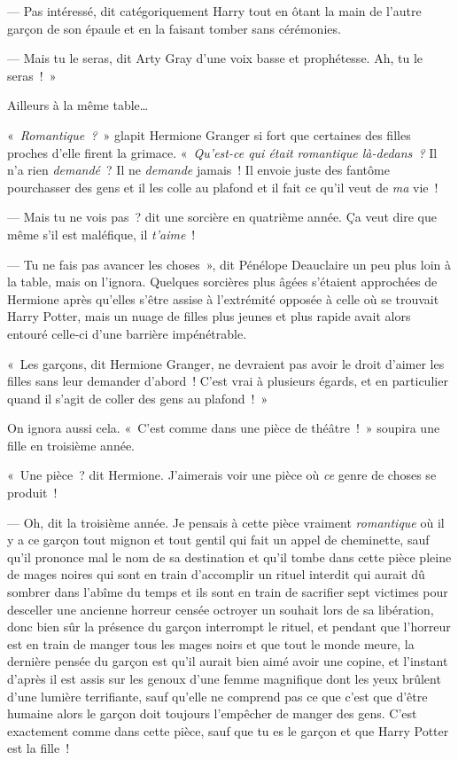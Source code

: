 --- Pas intéressé, dit catégoriquement Harry tout en ôtant la main de l'autre garçon de son épaule et en la faisant tomber sans cérémonies.

--- Mais tu le seras, dit Arty Gray d'une voix basse et prophétesse.
Ah, tu le seras~!~»

Ailleurs à la même table…

«~\emph{Romantique~?}~» glapit Hermione Granger si fort que certaines des filles proches d'elle firent la grimace.
«~\emph{Qu'est-ce qui était romantique là-dedans~?} Il n'a rien \emph{demandé}~?
Il ne \emph{demande} jamais~!
Il envoie juste des fantôme pourchasser des gens et il les colle au plafond et il fait ce qu'il veut de \emph{ma} vie~!

--- Mais tu ne vois pas~? dit une sorcière en quatrième année.
Ça veut dire que même s'il est maléfique, il \emph{t'aime}~!

--- Tu ne fais pas avancer les choses~», dit Pénélope Deauclaire un peu plus loin à la table, mais on l'ignora.
Quelques sorcières plus âgées s'étaient approchées de Hermione après qu'elles s'être assise à l'extrémité opposée à celle où se trouvait Harry Potter, mais un nuage de filles plus jeunes et plus rapide avait alors entouré celle-ci d'une barrière impénétrable.

«~Les garçons, dit Hermione Granger, ne devraient pas avoir le droit d'aimer les filles sans leur demander d'abord~!
C'est vrai à plusieurs égards, et en particulier quand il s'agit de coller des gens au plafond~!~»

On ignora aussi cela.
«~C'est comme dans une pièce de théâtre~!~»
soupira une fille en troisième année.

«~Une pièce~? dit Hermione.
J'aimerais voir une pièce où \emph{ce} genre de choses se produit~!

--- Oh, dit la troisième année.
Je pensais à cette pièce vraiment \emph{romantique} où il y a ce garçon tout mignon et tout gentil qui fait un appel de cheminette, sauf qu'il prononce mal le nom de sa destination et qu'il tombe dans cette pièce pleine de mages noires qui sont en train d'accomplir un rituel interdit qui aurait dû sombrer dans l'abîme du temps et ils sont en train de sacrifier sept victimes pour desceller une ancienne horreur censée octroyer un souhait lors de sa libération, donc bien sûr la présence du garçon interrompt le rituel, et pendant que l'horreur est en train de manger tous les mages noirs et que tout le monde meure, la dernière pensée du garçon est qu'il aurait bien aimé avoir une copine, et l'instant d'après il est assis sur les genoux d'une femme magnifique dont les yeux brûlent d'une lumière terrifiante, sauf qu'elle ne comprend pas ce que c'est que d'être humaine alors le garçon doit toujours l'empêcher de manger des gens.
C'est exactement comme dans cette pièce, sauf que tu es le garçon et que Harry Potter est la fille~!

